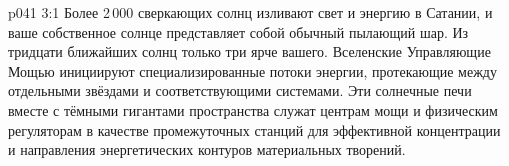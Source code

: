 \vs p041 3:1 Более 2\,000 сверкающих солнц изливают свет и энергию в Сатании, и ваше собственное солнце представляет собой обычный пылающий шар. Из тридцати ближайших солнц только три ярче вашего. Вселенские Управляющие Мощью инициируют специализированные потоки энергии, протекающие между отдельными звёздами и соответствующими системами. Эти солнечные печи вместе с тёмными гигантами пространства служат центрам мощи и физическим регуляторам в качестве промежуточных станций для эффективной концентрации и направления энергетических контуров материальных творений.
